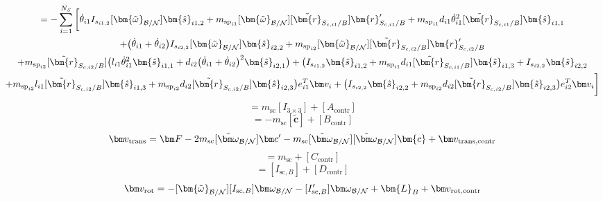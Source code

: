 \begin{multline}
\end{multline}\begin{multline}
	[v_{\text{rot,contr}}] = -\sum\limits_{i=1}^{N_S} \bigg[
	\dot{\theta}_{i1} I_{s_{i1,2}} [\bm{\tilde{\omega}}_{\cal B/N}] \bm{\hat{s}}_{i1,2}
	+m_{\text{sp}_{i1}} [\bm{\tilde{\omega}}_{\cal B/N}] [\tilde{\bm{r}}_{S_{c,i1}/B}] \bm{r}'_{S_{c,i1}/B} +m_{\text{sp}_{i1}}d_{i1}\dot{\theta}_{i1}^2  [\tilde{\bm{r}}_{S_{c,i1}/B}] \bm{\hat{s}}_{i1,1}
	\\
	+ \big(\dot{\theta}_{i1}+\dot{\theta}_{i2}\big) I_{s_{i2,2}}[\bm{\tilde{\omega}}_{\cal B/N}]\bm{\hat{s}}_{i2,2}
	+m_{\text{sp}_{i2}} [\bm{\tilde{\omega}}_{\cal B/N}] [\tilde{\bm{r}}_{S_{c,i2}/B}] \bm{r}'_{S_{c,i2}/B} 	\\+m_{\text{sp}_{i2}} [\tilde{\bm{r}}_{S_{c,i2}/B}] \big(l_{i1} \dot{\theta}_{i1}^2 \bm{\hat{s}}_{i1,1} + d_{i2}\big(\dot{\theta}_{i1} + \dot{\theta}_{i2}\big)^2\bm{\hat{s}}_{i2,1}\big) +   \big(I_{s_{i1,2}}\bm{\hat{s}}_{i1,2}+m_{\text{sp}_{i1}}d_{i1} [\tilde{\bm{r}}_{S_{c,i1}/B}]   \bm{\hat{s}}_{i1,3} + I_{s_{i2,2}}\bm{\hat{s}}_{i2,2}\\
	+m_{\text{sp}_{i2}}l_{i1} [\tilde{\bm{r}}_{S_{c,i2}/B}]  \bm{\hat{s}}_{i1,3}+m_{\text{sp}_{i2}}d_{i2} [\tilde{\bm{r}}_{S_{c,i2}/B}] \bm{\hat{s}}_{i2,3}\big)e_{i1}^T\bm v_i+\big( I_{s_{i2,2}}\bm{\hat{s}}_{i2,2}+m_{\text{sp}_{i2}} d_{i2} [\tilde{\bm{r}}_{S_{c,i2}/B}] \bm{\hat{s}}_{i2,3}\big)e_{i2}^T\bm v_i\bigg]
\end{multline}\begin{equation}
	[A]  = m_\text{sc} [I_{3\times 3}] + [A_{\text{contr}}]
\end{equation}\begin{equation}
	[B] = -m_\text{sc} [\tilde{\bm{c}}] + [B_{\text{contr}}]
\end{equation}\begin{equation}
	\bm v_{\text{trans}} = \bm F - 2m_\text{sc} [\tilde{\bm\omega}_{\cal B/N}] \bm c'- m_\text{sc} [\tilde{\bm\omega}_{\cal B/N}][\tilde{\bm\omega}_{\cal B/N}]\bm{c} + \bm v_{\text{trans,contr}}
\end{equation}\begin{equation}
	[C] = m_{\text{sc}} + [C_{\text{contr}}]
\end{equation}\begin{equation}
	[D] =  [I_{\text{sc},B}] + [D_{\text{contr}}]
\end{equation}\begin{equation}
	\bm v_{\text{rot}} = -[\bm{\tilde{\omega}}_{\cal B/N}] [I_{\text{sc},B}] \bm\omega_{\cal B/N} - [I'_{\text{sc},B}] \bm\omega_{\cal B/N} + \bm{L}_B + \bm v_{\text{rot,contr}}
\end{equation}


